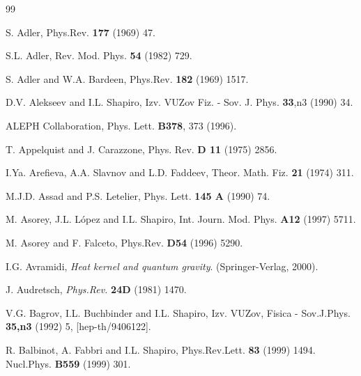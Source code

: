 \begin{thebibliography}{99}

 S. Adler, Phys.Rev. {\bf 177} (1969) 47.

S.L. Adler, Rev. Mod. Phys. {\bf 54} (1982) 729.

S. Adler and W.A. Bardeen, Phys.Rev. {\bf 182} (1969) 1517.

 D.V. Alekseev and I.L. Shapiro,
Izv. VUZov Fiz. -  Sov. J. Phys. {\bf 33},n3 (1990) 34. %

ALEPH Collaboration, Phys. Lett. {\bf B378}, 373 (1996).

   T. Appelquist and J. Carazzone,
{Phys. Rev.} {\bf D 11} (1975) 2856.

 I.Ya. Arefieva, A.A. Slavnov and L.D. Faddeev,
Theor. Math. Fiz. {\bf 21} (1974) 311.

M.J.D. Assad and P.S. Letelier, Phys. Lett. {\bf 145 A} (1990) 74.

 M. Asorey, J.L. L\'opez and I.L. Shapiro,
Int. Journ. Mod. Phys. {\bf A12} (1997) 5711.

 M. Asorey and F. Falceto,
Phys.Rev. {\bf D54} (1996) 5290.

I.G. Avramidi, 
{\sl Heat kernel and quantum gravity}. (Springer-Verlag, 2000). 

J. Audretsch, {\sl Phys.Rev.} {\bf 24D} (1981) 1470.

V.G. Bagrov, I.L. Buchbinder and I.L. Shapiro,
Izv. VUZov, Fisica - Sov.J.Phys.
{\bf 35,n3} (1992) 5, [hep-th/9406122].

R. Balbinot, A. Fabbri and I.L. Shapiro,
 Phys.Rev.Lett. {\bf 83} (1999) 1494.  %
 Nucl.Phys. {\bf B559} (1999) 301. %


\end{thebibliography}

